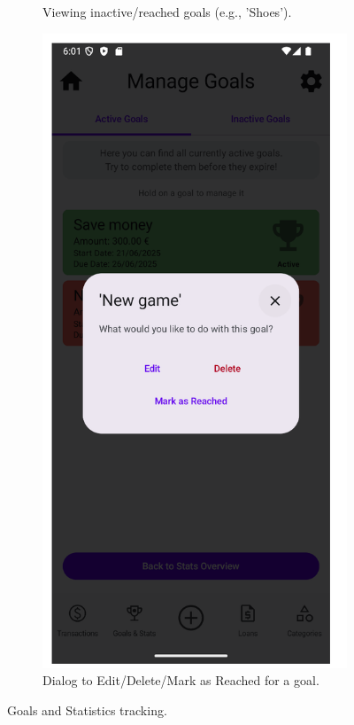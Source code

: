 \documentclass[a4paper,12pt]{article}
\begin{document}
\begin{figure}[H]
\begin{subfigure}[b]{0.23\textwidth}
        \caption{Viewing inactive/reached goals (e.g., 'Shoes').}
        \label{fig:manage_goals_inactive}
    \end{subfigure}
    \hfill
    \begin{subfigure}[b]{0.23\textwidth}
        \includegraphics[width=\textwidth]{manage_goals_interaction_dialog.png}
        \caption{Dialog to Edit/Delete/Mark as Reached for a goal.}
        \label{fig:goal_actions_dialog}
    \end{subfigure}
    \caption{Goals and Statistics tracking.}
    \label{fig:goals_stats_tracking_1}
\end{figure}
\end{document}
